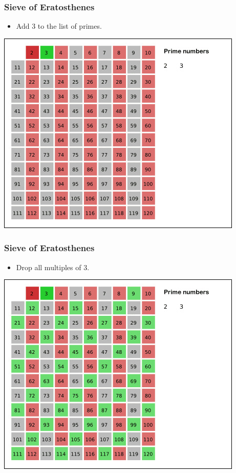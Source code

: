 \documentclass[11pt]{beamer}
\begin{document}
\begin{frame}
\frametitle{Sieve of Eratosthenes}
\centering
\begin{itemize}
  \item  Add $3$ to  the list of primes.
\end{itemize}
    \includegraphics[scale=0.45]{resources/sieve-61.jpg}
\end{frame}

\begin{frame}
\frametitle{Sieve of Eratosthenes}
\centering
\begin{itemize}
  \item Drop all multiples of $3$.
\end{itemize}
    \includegraphics[scale=0.45]{resources/sieve-99.jpg}
\end{frame}
\end{document}
